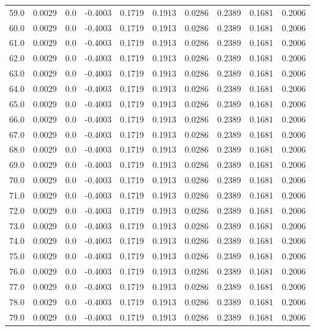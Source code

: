 \begin{longtable}{lrrrrrrrrr}
59.0 & 0.0029 & 0.0 & -0.4003 & 0.1719 & 0.1913 & 0.0286 & 0.2389 & 0.1681 & 0.2006 \\
60.0 & 0.0029 & 0.0 & -0.4003 & 0.1719 & 0.1913 & 0.0286 & 0.2389 & 0.1681 & 0.2006 \\
61.0 & 0.0029 & 0.0 & -0.4003 & 0.1719 & 0.1913 & 0.0286 & 0.2389 & 0.1681 & 0.2006 \\
62.0 & 0.0029 & 0.0 & -0.4003 & 0.1719 & 0.1913 & 0.0286 & 0.2389 & 0.1681 & 0.2006 \\
63.0 & 0.0029 & 0.0 & -0.4003 & 0.1719 & 0.1913 & 0.0286 & 0.2389 & 0.1681 & 0.2006 \\
64.0 & 0.0029 & 0.0 & -0.4003 & 0.1719 & 0.1913 & 0.0286 & 0.2389 & 0.1681 & 0.2006 \\
65.0 & 0.0029 & 0.0 & -0.4003 & 0.1719 & 0.1913 & 0.0286 & 0.2389 & 0.1681 & 0.2006 \\
66.0 & 0.0029 & 0.0 & -0.4003 & 0.1719 & 0.1913 & 0.0286 & 0.2389 & 0.1681 & 0.2006 \\
67.0 & 0.0029 & 0.0 & -0.4003 & 0.1719 & 0.1913 & 0.0286 & 0.2389 & 0.1681 & 0.2006 \\
68.0 & 0.0029 & 0.0 & -0.4003 & 0.1719 & 0.1913 & 0.0286 & 0.2389 & 0.1681 & 0.2006 \\
69.0 & 0.0029 & 0.0 & -0.4003 & 0.1719 & 0.1913 & 0.0286 & 0.2389 & 0.1681 & 0.2006 \\
70.0 & 0.0029 & 0.0 & -0.4003 & 0.1719 & 0.1913 & 0.0286 & 0.2389 & 0.1681 & 0.2006 \\
71.0 & 0.0029 & 0.0 & -0.4003 & 0.1719 & 0.1913 & 0.0286 & 0.2389 & 0.1681 & 0.2006 \\
72.0 & 0.0029 & 0.0 & -0.4003 & 0.1719 & 0.1913 & 0.0286 & 0.2389 & 0.1681 & 0.2006 \\
73.0 & 0.0029 & 0.0 & -0.4003 & 0.1719 & 0.1913 & 0.0286 & 0.2389 & 0.1681 & 0.2006 \\
74.0 & 0.0029 & 0.0 & -0.4003 & 0.1719 & 0.1913 & 0.0286 & 0.2389 & 0.1681 & 0.2006 \\
75.0 & 0.0029 & 0.0 & -0.4003 & 0.1719 & 0.1913 & 0.0286 & 0.2389 & 0.1681 & 0.2006 \\
76.0 & 0.0029 & 0.0 & -0.4003 & 0.1719 & 0.1913 & 0.0286 & 0.2389 & 0.1681 & 0.2006 \\
77.0 & 0.0029 & 0.0 & -0.4003 & 0.1719 & 0.1913 & 0.0286 & 0.2389 & 0.1681 & 0.2006 \\
78.0 & 0.0029 & 0.0 & -0.4003 & 0.1719 & 0.1913 & 0.0286 & 0.2389 & 0.1681 & 0.2006 \\
79.0 & 0.0029 & 0.0 & -0.4003 & 0.1719 & 0.1913 & 0.0286 & 0.2389 & 0.1681 & 0.2006 \\

\end{longtable}
